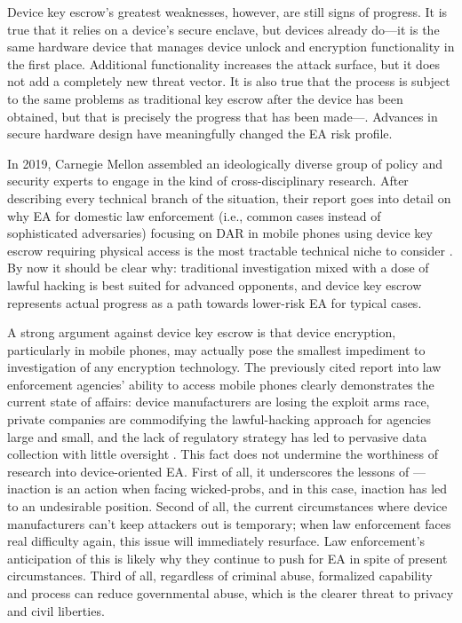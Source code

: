 Device key escrow's greatest weaknesses, however, are still signs of progress. It is true that it relies on a device's
secure enclave, but devices already do---it is the same hardware device that manages device unlock and encryption
functionality in the first place. Additional functionality increases the attack surface, but it does not add a
completely new threat vector. It is also true that the process is subject to the same problems as traditional key escrow
after the device has been obtained, but that is precisely the progress that has been made---. Advances in secure hardware design have meaningfully changed the \ac{EA} risk profile.

In 2019, Carnegie Mellon assembled an ideologically diverse group of policy and security experts to engage in the kind
of cross-disciplinary research. After describing every technical branch of the situation, their report goes into detail
on why \ac{EA} for domestic law enforcement (i.e., common cases instead of sophisticated adversaries) focusing on
\ac{DAR} in mobile phones using device key escrow requiring physical access is the most tractable technical niche to
consider \cite{group_2019}. By now it should be clear why: traditional investigation mixed with a dose of lawful hacking
is best suited for advanced opponents, and device key escrow represents actual progress as a path towards lower-risk
\ac{EA} for typical cases.

A strong argument against device key escrow is that device encryption, particularly in mobile phones, may actually pose
the smallest impediment to investigation of any encryption technology. The previously cited report into law enforcement
agencies' ability to access mobile phones clearly demonstrates the current state of affairs: device manufacturers are
losing the exploit arms race, private companies are commodifying the \ac{lawful-hacking} approach for agencies large and
small, and the lack of regulatory strategy has led to pervasive data collection with little oversight
\cite{koepke_2020}. This fact does not undermine the worthiness of research into device-oriented \ac{EA}. First of all,
it underscores the lessons of ---inaction is an action when facing \acp{wicked-prob}, and in this
case, inaction has led to an undesirable position. Second of all, the current circumstances where device manufacturers
can't keep attackers out is temporary; when law enforcement faces real difficulty again, this issue will immediately
resurface. Law enforcement's anticipation of this is likely why they continue to push for \ac{EA} in spite of present
circumstances. Third of all, regardless of criminal abuse, formalized capability and process can reduce governmental
abuse, which is the clearer threat to privacy and civil liberties.

